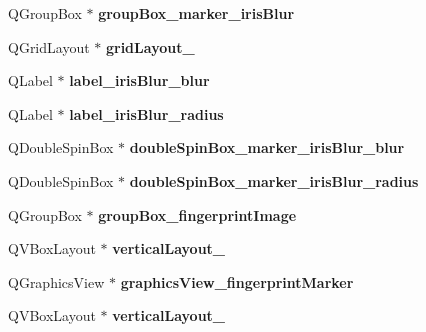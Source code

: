 \begin{DoxyCompactItemize}
\mbox{\label{class_ui___main_window_af3573c8736c8541327e87b2c82b8e90e}} 
Q\+Group\+Box $\ast$ {\bfseries group\+Box\+\_\+marker\+\_\+iris\+Blur}
\item 
\mbox{\label{class_ui___main_window_a4c2d544352d423a361b8ab2e1d5636ec}} 
Q\+Grid\+Layout $\ast$ {\bfseries grid\+Layout\+\_}
\item 
\mbox{\label{class_ui___main_window_a4a55d06c988c7ab428860c72833f6416}} 
Q\+Label $\ast$ {\bfseries label\+\_\+iris\+Blur\+\_\+blur}
\item 
\mbox{\label{class_ui___main_window_adaa36377d85003b5b45464b557300fc8}} 
Q\+Label $\ast$ {\bfseries label\+\_\+iris\+Blur\+\_\+radius}
\item 
\mbox{\label{class_ui___main_window_a049510a807185c9a6cd26b2dff352a9e}} 
Q\+Double\+Spin\+Box $\ast$ {\bfseries double\+Spin\+Box\+\_\+marker\+\_\+iris\+Blur\+\_\+blur}
\item 
\mbox{\label{class_ui___main_window_ad62a006dc536d56fd16981267d197f8d}} 
Q\+Double\+Spin\+Box $\ast$ {\bfseries double\+Spin\+Box\+\_\+marker\+\_\+iris\+Blur\+\_\+radius}
\item 
\mbox{\label{class_ui___main_window_a1026ab8e516d53835c40314844b497c5}} 
Q\+Group\+Box $\ast$ {\bfseries group\+Box\+\_\+fingerprint\+Image}
\item 
\mbox{\label{class_ui___main_window_a93c190b085c63a667c535ba0bbcfec7c}} 
Q\+V\+Box\+Layout $\ast$ {\bfseries vertical\+Layout\+\_}
\item 
\mbox{\label{class_ui___main_window_a324d412b25b4c80ae999e0105b63a80c}} 
Q\+Graphics\+View $\ast$ {\bfseries graphics\+View\+\_\+fingerprint\+Marker}
\item 
\mbox{\label{class_ui___main_window_a9022dbb281d9d46048c96ca1041e0905}} 
Q\+V\+Box\+Layout $\ast$ {\bfseries vertical\+Layout\+\_}
\item 

\end{DoxyCompactItemize}
